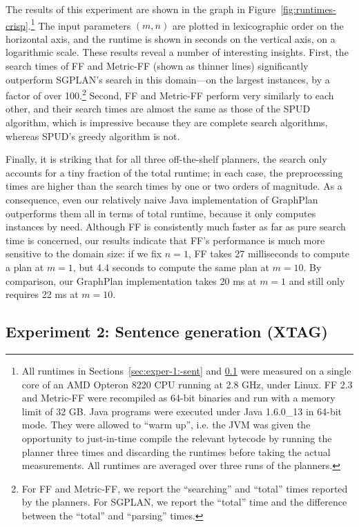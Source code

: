 The results of this experiment are shown in the graph in
Figure~\ref{fig:runtimes-crisp}.\footnote{All runtimes in
  Sections~\ref{sec:exper-1:-sent} and \ref{sec:exper-2:-sent-xtag}
  were measured on a single core of an AMD Opteron 8220 CPU running at
  2.8 GHz, under Linux. FF 2.3 and Metric-FF were recompiled as 64-bit
  binaries and run with a memory limit of 32 GB. Java programs were
  executed under Java 1.6.0\_13 in 64-bit mode. They were allowed to
  ``warm up'', i.e. the JVM was given the opportunity to just-in-time
  compile the relevant bytecode by running the planner three times and
  discarding the runtimes before taking the actual measurements. All
  runtimes are averaged over three runs of the planners.} The input
parameters $(m,n)$ are plotted in lexicographic order on the
horizontal axis, and the runtime is shown in seconds on the vertical
axis, on a logarithmic scale. These results reveal a number of
interesting insights. First, the search times of FF and Metric-FF
(shown as thinner lines) significantly outperform SGPLAN's search in
this domain---on the largest instances, by a factor of over
100.\footnote{For FF and Metric-FF, we report the ``searching'' and
  ``total'' times reported by the planners. For SGPLAN, we report the
  ``total'' time and the difference between the ``total'' and
  ``parsing'' times.} Second, FF and Metric-FF perform very similarly
to each other, and their search times are almost the same as those of
the SPUD algorithm, which is impressive because they are complete
search algorithms, whereas SPUD's greedy algorithm is not.

Finally, it is striking that for all three off-the-shelf planners, the
search only accounts for a tiny fraction of the total runtime; in each
case, the preprocessing times are higher than the search times by one
or two orders of magnitude. As a consequence, even our relatively
naive Java implementation of GraphPlan outperforms them all in terms
of total runtime, because it only computes instances by need. Although
FF is consistently much faster as far as pure search time is
concerned, our results indicate that FF's performance is much more
sensitive to the domain size: if we fix $n=1$, FF takes 27
milliseconds to compute a plan at $m=1$, but 4.4 seconds to compute
the same plan at $m=10$. By comparison, our GraphPlan implementation
takes 20 ms at $m=1$ and still only requires 22 ms at
$m=10$.



\subsection{Experiment 2: Sentence generation (XTAG)}
\label{sec:exper-2:-sent-xtag}

